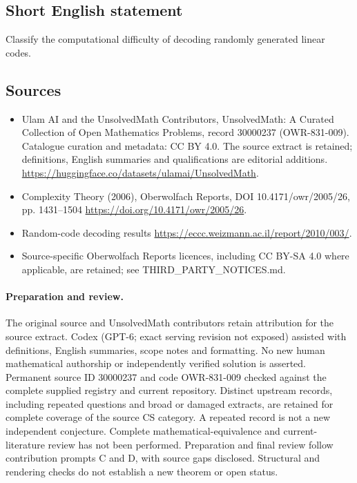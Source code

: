 \documentclass[11pt]{article}
\begin{document}
\subsection{Short English statement}
Classify the computational difficulty of decoding randomly generated linear codes.
\subsection{Sources}
\begin{itemize}
\item[\hypertarget{source:30000237:1}{S1}] Ulam AI and the UnsolvedMath Contributors, UnsolvedMath: A Curated Collection of Open Mathematics Problems, record 30000237 (OWR-831-009). Catalogue curation and metadata: CC BY 4.0. The source extract is retained; definitions, English summaries and qualifications are editorial additions.
\url{https://huggingface.co/datasets/ulamai/UnsolvedMath}.
\item[\hypertarget{source:30000237:2}{S2}] Complexity Theory (2006), Oberwolfach Reports, DOI 10.4171/owr/2005/26, pp. 1431--1504
\url{https://doi.org/10.4171/owr/2005/26}.
\item[\hypertarget{source:30000237:3}{S3}] Random-code decoding results
\url{https://eccc.weizmann.ac.il/report/2010/003/}.
\item Source-specific Oberwolfach Reports licences, including CC BY-SA 4.0 where applicable, are retained; see THIRD\_PARTY\_NOTICES.md.
\end{itemize}
\paragraph{Preparation and review.}
The original source and UnsolvedMath contributors retain attribution for the source extract. Codex (GPT-6; exact serving revision not exposed) assisted with definitions, English summaries, scope notes and formatting. No new human mathematical authorship or independently verified solution is asserted. Permanent source ID 30000237 and code OWR-831-009 checked against the complete supplied registry and current repository. Distinct upstream records, including repeated questions and broad or damaged extracts, are retained for complete coverage of the source CS category. A repeated record is not a new independent conjecture. Complete mathematical-equivalence and current-literature review has not been performed. Preparation and final review follow contribution prompts C and D, with source gaps disclosed. Structural and rendering checks do not establish a new theorem or open status.
\label{end:30000237}
\end{document}
